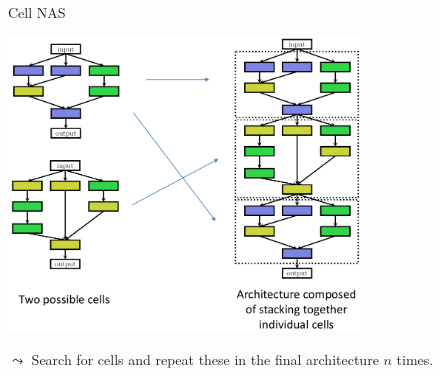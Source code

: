 \begin{frame}[c]{Cell NAS}

\centering
\includegraphics[width=0.7\textwidth]{images/nas_cellsearch.png}

$\leadsto$ Search for cells and repeat these in the final architecture $n$ times.

\end{frame}
